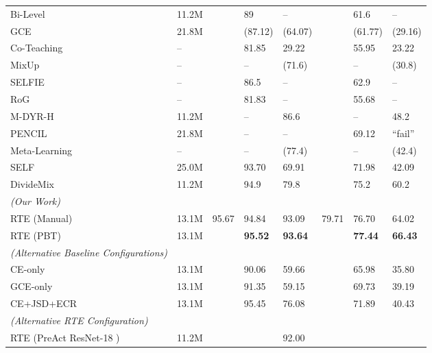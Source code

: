 \documentclass{article}
\renewcommand{\b}[1]{\textbf{#1}}
\begin{document}
\begin{table*}[!htbp]
\begin{tabular}{llllllll}
Bi-Level \cite{jenni2018}       & 11.2M     && 89           & --          && 61.6         & --             \\
GCE \cite{zhang2018}            & 21.8M     && (87.12)      & (64.07)     && (61.77)      & (29.16)      \\
Co-Teaching \cite{han2018}      & --        && 81.85        & 29.22       && 55.95        & 23.22        \\
MixUp \cite{zhang2018mixup}     & --        && --           & (71.6)      && --           & (30.8)       \\
SELFIE \cite{song2019}          & --        && 86.5         & --          && 62.9         & --             \\
RoG \cite{lee2019}              & --        && 81.83        & --          && 55.68        & --             \\
M-DYR-H \cite{arazo2019}        & 11.2M     && --           & 86.6        && --           & 48.2         \\
PENCIL \cite{yi2019}            & 21.8M     && --           & --          && 69.12        & ``fail''         \\
Meta-Learning \cite{li2019}     & --        && --           & (77.4)      && --           & (42.4)       \\
SELF \cite{nguyen2020}          & 25.0M     && 93.70        & 69.91       && 71.98        & 42.09        \\
DivideMix \cite{li2020}         & 11.2M     && 94.9         & 79.8        && 75.2         & 60.2         \\[1ex]
\emph{(Our Work)} \\[1ex]
RTE (Manual)                     & 13.1M    & 95.67 & 94.84        & 93.09   & 79.71    & 76.70        & 64.02        \\
RTE (PBT)                        & 13.1M     && \b{95.52}    & \b{93.64}   && \b{77.44}    & \b{66.43}    \\
\hline
\emph{(Alternative Baseline Configurations)} \\[1ex]
CE-only                          &13.1M&& 90.06  & 59.66 && 65.98   & 35.80 \\
GCE-only                         &13.1M&& 91.35  & 59.15 && 69.73   & 39.19 \\
CE+JSD+ECR                       &13.1M&& 95.45	& 76.08 && 71.89   & 40.43 \\ 
\hline
\emph{(Alternative RTE Configuration)} \\[1ex]
RTE (PreAct ResNet-18 \cite{2016arXiv160305027H})       &11.2M&&& 92.00 &&&\\
\bottomrule
\end{tabular}
\end{table*}
\end{document}
